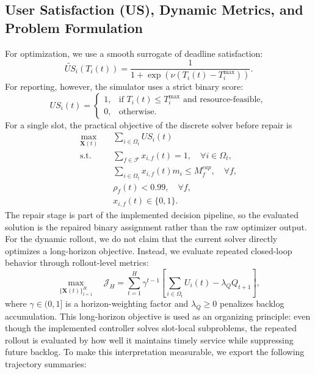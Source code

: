 \subsection{User Satisfaction (US), Dynamic Metrics, and Problem Formulation}
\label{sec:problem}
For optimization, we use a smooth surrogate of deadline satisfaction:
\begin{equation}
    \widetilde{US}_i(T_i(t)) = \frac{1}{1 + \exp(\nu (T_i(t) - T_i^{\max}))}.
\end{equation}
For reporting, however, the simulator uses a strict binary score:
\begin{equation}
    US_i(t)=
    \begin{cases}
        1, & \text{if } T_i(t) \le T_i^{\max} \text{ and resource-feasible},\\[2pt]
        0, & \text{otherwise}.
    \end{cases}
\end{equation}
For a single slot, the practical objective of the discrete solver before repair is
\begin{subequations}
\begin{align}
    \max_{\mathbf{X}(t)} \quad & \sum_{i \in \Omega_t} US_i(t) \\
    \text{s.t.} \quad & \sum_{f \in \mathcal{F}} x_{i,f}(t) = 1, \quad \forall i \in \Omega_t, \\
    & \sum_{i \in \Omega_t} x_{i,f}(t) m_i \le M_f^{cap}, \quad \forall f, \\
    & \rho_f(t) < 0.99, \quad \forall f, \\
    & x_{i,f}(t) \in \{0,1\}.
\end{align}
\end{subequations}
The repair stage is part of the implemented decision pipeline, so the evaluated solution is the repaired binary assignment rather than the raw optimizer output. For the dynamic rollout, we do not claim that the current solver directly optimizes a long-horizon objective. Instead, we evaluate repeated closed-loop behavior through rollout-level metrics:
\begin{equation}
    \max_{\{\mathbf{X}(t)\}_{t=1}^{H}} \quad \mathcal{J}_H = \sum_{t=1}^{H} \gamma^{t-1}\!\left[\sum_{i \in \Omega_t} U_i(t) - \lambda_Q Q_{t+1}\right],
\end{equation}
where $\gamma \in (0,1]$ is a horizon-weighting factor and $\lambda_Q \ge 0$ penalizes backlog accumulation. This long-horizon objective is used as an organizing principle: even though the implemented controller solves slot-local subproblems, the repeated rollout is evaluated by how well it maintains timely service while suppressing future backlog. To make this interpretation measurable, we export the following trajectory summaries:
